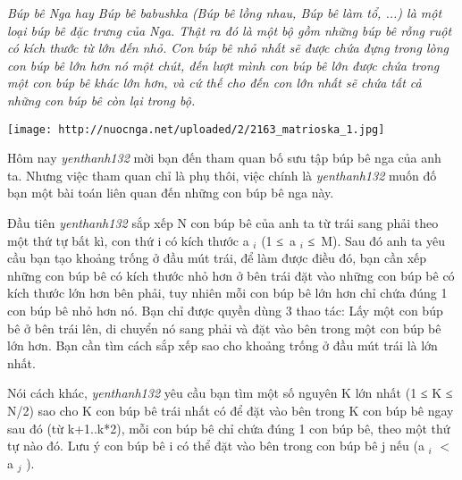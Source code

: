 \emph{    Búp bê Nga hay Búp bê babushka (Búp bê lồng nhau, Búp bê làm tổ, ...) là một loại búp bê đặc trưng của Nga. Thật ra đó là một bộ gồm những búp bê rỗng ruột có kích thước từ lớn đến nhỏ. Con búp bê nhỏ nhất sẽ được chứa đựng trong lòng con búp bê lớn hơn nó một chút, đến lượt mình con búp bê lớn được chứa trong một con búp bê khác lớn hơn, và cứ thế cho đến con lớn nhất sẽ chứa tất cả những con búp bê còn lại trong bộ.   }


\texttt{[image: http://nuocnga.net/uploaded/2/2163\_matrioska\_1.jpg]}

   Hôm nay   \emph{    yenthanh132   }   mời bạn đến tham quan bố sưu tập búp bê nga của anh ta. Nhưng việc tham quan chỉ là phụ thôi, việc chính là   \emph{    yenthanh132   }   muốn đố bạn một bài toán liên quan đến những con búp bê nga này.  

   Đầu tiên   \emph{    yenthanh132   }   sắp xếp N con búp bê của anh ta từ trái sang phải theo một thứ tự bất kì, con thứ i có kích thước a   $_    i   $   (1 ≤ a   $_    i   $   ≤ M). Sau đó anh ta yêu cầu bạn tạo khoảng trống ở đầu mút trái, để làm được điều đó, bạn cần xếp những con búp bê có kích thước nhỏ hơn ở bên trái đặt vào những con búp bê có kích thước lớn hơn bên phải, tuy nhiên mỗi con búp bê lớn hơn chỉ chứa đúng 1 con búp bê nhỏ hơn nó. Bạn chỉ được quyền dùng 3 thao tác: Lấy một con búp bê ở bên trái lên, di chuyển nó sang phải và       đặt vào bên trong      một con búp bê lớn hơn. Bạn cần tìm cách sắp xếp sao cho khoảng trống ở đầu mút trái là lớn nhất.  

   Nói cách khác,   \emph{    yenthanh132   }   yêu cầu bạn tìm một số nguyên K lớn nhất (1 ≤ K ≤ N/2) sao cho K con búp bê trái nhất có để đặt vào bên trong K con búp bê ngay sau đó (từ k+1..k*2), mỗi con búp bê chỉ chứa đúng 1 con búp bê, theo một thứ tự nào đó. Lưu ý con búp bê i có thể đặt vào bên trong con búp bê j nếu (a   $_    i   $   $<$ a   $_    j   $   ).